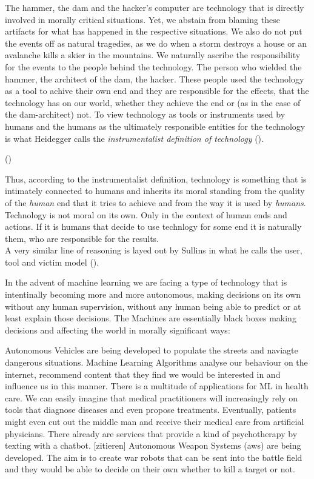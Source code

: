 \documentclass{article}
\begin{document}
The hammer, the dam and the hacker's computer are technology that is directly
involved in morally critical situations. Yet, we abstain from blaming these
artifacts for what has happened in the respective situations. We also do not put
the events off as natural tragedies, as we do when a storm destroys a house or
an avalanche kills a skier in the mountains. We naturally ascribe the
responsibility for the events to the people behind the technology.
The person who wielded the hammer, the architect of the dam, the hacker.
These people used the technology as a tool to achive their own end and they are
responsible for the effects, that the technology has on our world, whether they
achieve the end or (as in the case of the dam-architect) not.
To view technology as tools or instruments used by humans and the humans as the ultimately
responsible entities for the technology is what Heidegger calls the \textit{instrumentalist
definition of technology} (\cite{heidegger1977technology}). 

(\cite[p.4]{heidegger1977technology})

Thus, according to the instrumentalist definition, technology is something that
is intimately connected to humans and inherits its moral standing from the
quality of the \textit{human} end that it tries to achieve and from the way
it is used by \textit{humans}. Technology is not moral on its own. Only in the
context of human ends and actions. If it is humans that decide to use technlogy
for some end it is naturally them, who are responsible for the results.\\
A very similar line of reasoning is layed out by Sullins in what he calls the user, tool and victim
model (\cite[p. 152]{sullins2006robot}).

In the advent of machine learning we are facing a type of technology that is
intentinally becoming more and more autonomous, making decisions on its own
without any human supervision, without any human being able to predict or at
least explain those decisions. The Machines are essentially black boxes making
decisions and affecting the world in morally significant ways:

Autonomous Vehicles are being developed to populate the streets and naviagte
dangerous situations.
Machine Learning Algorithms analyse our behaviour on the internet, recommend
content that they find we would be interested in and influence us in this
manner.
There is a multitude of applications for ML in health care. We can easily
imagine that medical practitioners will increasingly rely on tools that diagnose
diseases and even propose treatments. Eventually, patients might even cut
out the middle man and receive their medical care from artificial physicians.
There already are services that provide a kind of psychotherapy by texting with
a chatbot. [zitieren]
Autonomous Weapon Systems (\acrshort{aws}) are being developed. The aim is to
create war robots that can be sent into the battle field and they would be able
to decide on their own whether to kill a target or not.
\end{document}
